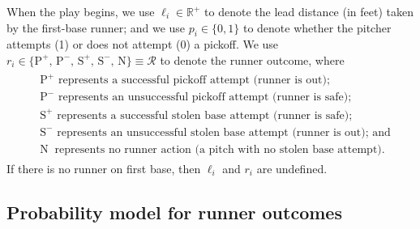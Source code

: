 \documentclass[11pt]{article}
\begin{document}
    When the play begins, we use $\ell_i \in \mathbb{R}^+$ to denote the lead distance (in feet) taken by the first-base runner; and we use $p_i \in \{0, 1\}$ to denote whether the pitcher attempts (1) or does not attempt (0) a pickoff. We use $r_i \in \{\mbox{P}^+,\, \mbox{P}^-,\, \mbox{S}^+,\, \mbox{S}^-,\, \mbox{N}\} \equiv \mathcal{R}$ to denote the runner outcome, where
    \begin{align}
    \label{eqn:runner-outcome}
      \begin{split}
        & \mbox{P}^+  \mbox{ represents a successful pickoff attempt (runner is out);}\\
        & \mbox{P}^-  \mbox{ represents an unsuccessful pickoff attempt (runner is safe);}\\
        & \mbox{S}^+  \mbox{ represents a successful stolen base attempt (runner is safe);}\\
        & \mbox{S}^-  \mbox{ represents an unsuccessful stolen base attempt (runner is out); and}\\
        & \mbox{N}~   \mbox{ represents no runner action (a pitch with no stolen base attempt).}
      \end{split}
    \end{align}
    If there is no runner on first base, then $\ell_i$ and $r_i$ are undefined.

    \subsection{Probability model for runner outcomes}
    \label{sec:prob-runner-outcome}
\end{document}
